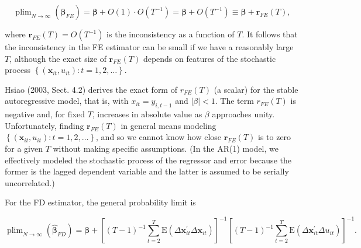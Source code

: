 \documentclass[10pt]{article}
\begin{document}
\begin{equation*}
\operatorname{plim}_{N \rightarrow \infty}\left(\hat{\boldsymbol{\beta}}_{F E}\right)=\boldsymbol{\beta}+O(1) \cdot O\left(T^{-1}\right)=\boldsymbol{\beta}+O\left(T^{-1}\right) \equiv \boldsymbol{\beta}+\mathbf{r}_{F E}(T), \tag{10.76}
\end{equation*}


where $\mathbf{r}_{F E}(T)=O\left(T^{-1}\right)$ is the inconsistency as a function of $T$. It follows that the inconsistency in the FE estimator can be small if we have a reasonably large $T$, although the exact size of $\mathbf{r}_{F E}(T)$ depends on features of the stochastic process $\left\{\left(\mathbf{x}_{i t}, u_{i t}\right): t=1,2, \ldots\right\}$.

Hsiao (2003, Sect. 4.2) derives the exact form of $r_{F E}(T)$ (a scalar) for the stable autoregressive model, that is, with $x_{i t}=y_{i, t-1}$ and $|\beta|<1$. The term $r_{F E}(T)$ is negative and, for fixed $T$, increases in absolute value as $\beta$ approaches unity. Unfortunately, finding $\mathbf{r}_{F E}(T)$ in general means modeling $\left\{\left(\mathbf{x}_{i t}, u_{i t}\right): t=1,2, \ldots\right\}$, and so we cannot know how close $\mathbf{r}_{F E}(T)$ is to zero for a given $T$ without making specific assumptions. (In the AR(1) model, we effectively modeled the stochastic process of the regressor and error because the former is the lagged dependent variable and the latter is assumed to be serially uncorrelated.)

For the FD estimator, the general probability limit is


\begin{equation*}
\operatorname{plim}_{N \rightarrow \infty}\left(\hat{\boldsymbol{\beta}}_{F D}\right)=\boldsymbol{\beta}+\left[(T-1)^{-1} \sum_{t=2}^{T} \mathrm{E}\left(\Delta \mathbf{x}_{i t}^{\prime} \Delta \mathbf{x}_{i t}\right)\right]^{-1}\left[(T-1)^{-1} \sum_{t=2}^{T} \mathrm{E}\left(\Delta \mathbf{x}_{i t}^{\prime} \Delta u_{i t}\right)\right]^{-1} . \tag{10.77}
\end{equation*}
\end{document}
